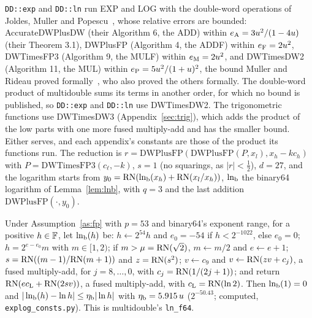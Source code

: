  \texttt{DD::exp} and \texttt{DD::ln} run EXP and LOG with the double-word operations of
Joldes, Muller and Popescu~\cite{JMP17}, whose relative errors are bounded: AccurateDWPlusDW (their Algorithm 6, the
ADD) within $e_{\rm A} = 3u^2/(1-4u)$ (their Theorem 3.1), DWPlusFP (Algorithm 4, the ADDF) within $e_{\rm F}
= 2u^2$, DWTimesFP3 (Algorithm 9, the MULF) within $e_{\rm M} = 2u^2$, and DWTimesDW2 (Algorithm 11, the
MUL) within $e_{\rm P} = 5u^2/(1+u)^2$, the bound Muller and Rideau proved formally~\cite{MR22}, who also proved
the others formally. The double-word product of multidouble sums its terms in another order, for which no bound is
published, so \texttt{DD::exp} and \texttt{DD::ln} use DWTimesDW2. The trigonometric functions use DWTimesDW3
(Appendix~\ref{sec:trig}), which adds the product of the low parts with one more fused multiply-add and has the smaller
bound. Either serves, and each appendix's constants are those of the product its functions run. The reduction is $r =
\mathrm{DWPlusFP}(\mathrm{DWPlusFP}(P, x_l), x_h - kc_h)$ with $P = \mathrm{DWTimesFP3}(c_\ell, -k)$, $s = 1$ (no
squarings, as $|r| < \frac12$), $d = 27$, and the logarithm starts from $y_0 = \mathrm{RN}(\ln_{\rm b}(x_h) + \mathrm{RN}(x_l/x_h))$,
$\ln_{\rm b}$ the binary64 logarithm of Lemma~\ref{lem:lnb}, with $q = 3$ and the last addition
$\mathrm{DWPlusFP}(\cdot, y_0)$.

\begin{lemma}\label{lem:lnb}
Under Assumption~\ref{as:fp} with $p = 53$ and binary64's exponent range, for a positive $h \in \mathbb{F}$, let $\ln_{\rm b}(h)$ be: $h
\gets 2^{54}h$ and $e_0 = -54$ if $h < 2^{-1022}$, else $e_0 = 0$; $h = 2^{e - e_0}m$ with $m \in [1, 2)$; if $m >
\mu = \mathrm{RN}(\sqrt 2)$, $m \gets m/2$ and $e \gets e + 1$; $s = \mathrm{RN}((m - 1)/\mathrm{RN}(m + 1))$ and $z = \mathrm{RN}(s^2)$; $v \gets
c_9$ and $v \gets \mathrm{RN}(zv + c_j)$, a fused multiply-add, for $j = 8, \dots, 0$, with $c_j = \mathrm{RN}(1/(2j+1))$; and return
$\mathrm{RN}(ec_{\rm L} + \mathrm{RN}(2sv))$, a fused multiply-add, with $c_{\rm L} = \mathrm{RN}(\ln 2)$. Then $\ln_{\rm b}(1) = 0$ and
$|\ln_{\rm b}(h) - \ln h| \le \eta_{\rm b}|\ln h|$ with $\eta_{\rm b} = 5.915\,u$ ($2^{-50.43}$; computed,
\texttt{explog\_consts.py}). This is
multidouble's \texttt{ln\_f64}.
\end{lemma}

